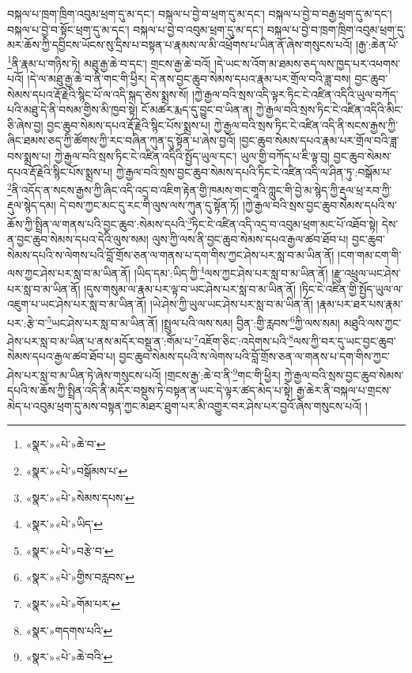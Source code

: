བསྐལ་པ་ཁྲག་ཁྲིག་འབུམ་ཕྲག་དུ་མ་དང་། བསྐལ་པ་བྱེ་བ་ཕྲག་དུ་མ་དང་། བསྐལ་པ་བྱེ་བ་བརྒྱ་ཕྲག་དུ་མ་དང་། བསྐལ་པ་བྱེ་བ་སྟོང་ཕྲག་དུ་མ་དང་། བསྐལ་པ་བྱེ་བ་འབུམ་ཕྲག་དུ་མ་དང་། བསྐལ་པ་བྱེ་བ་ཁྲག་ཁྲིག་འབུམ་ཕྲག་དུ་མར་ཆོས་ཀྱི་དབྱིངས་ཡོངས་སུ་དྲིས་པ་བསྟན་པ་རྣམས་ལ་མི་འཕྲོགས་པ་ཡིན་ནོ་ཞེས་གསུངས་པའོ། །རྒྱ་:ཆེན་པོ་\footnote{«སྣར་»«པེ་»ཆེ་བ་}ནི་རྣམ་པ་གཉིས་ཏེ། མཐུ་རྒྱ་ཆེ་བ་དང་། གྲངས་རྒྱ་ཆེ་བའོ། །དེ་ཡང་ས་འོག་མ་ཐམས་ཅད་ལས་ཁྱད་པར་འཕགས་པའོ། །དེ་ལ་མཐུ་རྒྱ་ཆེ་བ་ནི་གང་གི་ཕྱིར། དེ་ནས་བྱང་ཆུབ་སེམས་དཔའ་རྣམ་པར་གྲོལ་བའི་ཟླ་བས། བྱང་ཆུབ་སེམས་དཔའ་རྡོ་རྗེའི་སྙིང་པོ་ལ་འདི་སྐད་ཅེས་སྨྲས་སོ། །ཀྱེ་རྒྱལ་བའི་སྲས་འདི་ལྟར་ཏིང་ངེ་འཛིན་འདིའི་ཡུལ་བཀོད་པའི་མཐུ་དེ་ནི་བསམ་གྱིས་མི་ཁྱབ་སྟེ། ངོ་མཚར་རྨད་དུ་བྱུང་བ་ཡིན་ན། ཀྱེ་རྒྱལ་བའི་སྲས་ཏིང་ངེ་འཛིན་འདིའི་མིང་ཅི་ཞེས་བྱ། བྱང་ཆུབ་སེམས་དཔའ་རྡོ་རྗེའི་སྙིང་པོས་སྨྲས་པ། ཀྱེ་རྒྱལ་བའི་སྲས་ཏིང་ངེ་འཛིན་འདི་ནི་སངས་རྒྱས་ཀྱི་ཞིང་ཐམས་ཅད་ཀྱི་ཚོགས་ཀྱི་རང་བཞིན་ཀུན་དུ་སྟོན་པ་ཞེས་བྱའོ། །བྱང་ཆུབ་སེམས་དཔའ་རྣམ་པར་གྲོལ་བའི་ཟླ་བས་སྨྲས་པ། ཀྱེ་རྒྱལ་བའི་སྲས་ཏིང་ངེ་འཛིན་འདིའི་སྤྱོད་ཡུལ་དང་། ཡུལ་གྱི་བཀོད་པ་ཇི་ལྟ་བུ། བྱང་ཆུབ་སེམས་དཔའ་རྡོ་རྗེའི་སྙིང་པོས་སྨྲས་པ། ཀྱེ་རྒྱལ་བའི་སྲས་བྱང་ཆུབ་སེམས་དཔའི་ཏིང་ངེ་འཛིན་འདི་ལ་ཤིན་ཏུ་:བསྒོམ་པ་\footnote{«སྣར་»«པེ་»བསྒོམས་པ་}ནི་འདོད་ན་སངས་རྒྱས་ཀྱི་ཞིང་འདི་འདྲ་བ་འཇིག་རྟེན་གྱི་ཁམས་གང་གཱའི་ཀླུང་གི་བྱེ་མ་སྙེད་ཀྱི་རྡུལ་ཕྲ་རབ་ཀྱི་རྡུལ་སྙེད་དམ། དེ་བས་ཀྱང་མང་དུ་རང་གི་ལུས་ལས་ཀུན་དུ་སྟོན་ཏོ། །ཀྱེ་རྒྱལ་བའི་སྲས་བྱང་ཆུབ་སེམས་དཔའི་ས་ཆོས་ཀྱི་སྤྲིན་ལ་གནས་པའི་བྱང་ཆུབ་:སེམས་དཔའི་\footnote{«སྣར་»«པེ་»སེམས་དཔས་}ཏིང་ངེ་འཛིན་འདི་འདྲ་བ་འབུམ་ཕྲག་མང་པོ་འཐོབ་སྟེ། དེས་ན་བྱང་ཆུབ་སེམས་དཔའ་དེའི་ལུས་སམ། ལུས་ཀྱི་ལས་ནི་བྱང་ཆུབ་སེམས་དཔའ་རྒྱལ་ཚབ་ཐོབ་པ། བྱང་ཆུབ་སེམས་དཔའི་ས་ལེགས་པའི་བློ་གྲོས་ཅན་ལ་གནས་པ་དག་གིས་ཀྱང་ཤེས་པར་སླ་བ་མ་ཡིན་ནོ། །ངག་གམ་ངག་གི་ལས་ཀྱང་ཤེས་པར་སླ་བ་མ་ཡིན་ནོ། །ཡིད་དམ་:ཡིད་ཀྱི་\footnote{«སྣར་»«པེ་»ཡིད་}ལས་ཀྱང་ཤེས་པར་སླ་བ་མ་ཡིན་ནོ། །རྫུ་འཕྲུལ་ཡང་ཤེས་པར་སླ་བ་མ་ཡིན་ནོ། །དུས་གསུམ་ལ་རྣམ་པར་ལྟ་བ་ཡང་ཤེས་པར་སླ་བ་མ་ཡིན་ནོ། །ཏིང་ངེ་འཛིན་གྱི་སྤྱོད་ཡུལ་ལ་འཇུག་པ་ཡང་ཤེས་པར་སླ་བ་མ་ཡིན་ནོ། །ཡེ་ཤེས་ཀྱི་ཡུལ་ཡང་ཤེས་པར་སླ་བ་མ་ཡིན་ནོ། །རྣམ་པར་ཐར་པས་རྣམ་པར་:རྩེ་བ་\footnote{«སྣར་»«པེ་»བརྩེ་བ་}ཡང་ཤེས་པར་སླ་བ་མ་ཡིན་ནོ། །སྤྲུལ་པའི་ལས་སམ། བྱིན་:གྱི་རླབས་\footnote{«སྣར་»«པེ་»གྱིས་བརླབས་}ཀྱི་ལས་སམ། མཐུའི་ལས་ཀྱང་ཤེས་པར་སླ་བ་མ་ཡིན་པ་ནས་མདོར་བསྡུ་ན་:གོམ་པ་\footnote{«སྣར་»«པེ་»གོམ་པར་}འཇོག་ཅིང་:འདེགས་པའི་\footnote{«སྣར་»གདགས་པའི་}ལས་ཀྱི་བར་དུ་ཡང་བྱང་ཆུབ་སེམས་དཔའ་རྒྱལ་ཚབ་ཐོབ་པ། བྱང་ཆུབ་སེམས་དཔའི་ས་ལེགས་པའི་བློ་གྲོས་ཅན་ལ་གནས་པ་དག་གིས་ཀྱང་ཤེས་པར་སླ་བ་མ་ཡིན་ཏེ་ཞེས་གསུངས་པའོ། །གྲངས་རྒྱ་:ཆེ་བ་ནི་\footnote{«སྣར་»«པེ་»ཆེ་བའི་}གང་གི་ཕྱིར། ཀྱེ་རྒྱལ་བའི་སྲས་བྱང་ཆུབ་སེམས་དཔའི་ས་ཆོས་ཀྱི་སྤྲིན་འདི་ནི་མདོར་བསྡུས་ཏེ་བསྟན་ན་ཡང་དེ་ལྟར་ཚད་མེད་པ་སྟེ། རྒྱ་ཆེར་ནི་བསྐལ་པ་གྲངས་མེད་པ་འབུམ་ཕྲག་དུ་མས་བསྟན་ཀྱང་མཐར་ཐུག་པར་མི་འགྱུར་བར་ཤེས་པར་བྱའོ་ཞེས་གསུངས་པའོ། །
